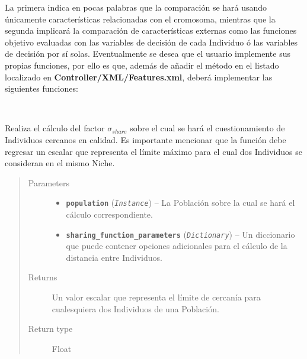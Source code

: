 \documentclass[class=report, crop=false]{standalone}
\begin{document}
La primera indica en pocas palabras que la comparación se 
hará usando únicamente características relacionadas con el 
cromosoma, mientras que la segunda implicará la comparación 
de características externas como las funciones objetivo evaluadas 
con las variables de decisión de cada Individuo ó las variables de 
decisión por sí solas.\medskip\break
Eventualmente se desea que el usuario implemente sus propias funciones, 
por ello es que, además de añadir el método en el listado localizado 
en \textbf{Controller/XML/Features.xml}, deberá implementar las siguientes 
funciones:

\begin{fulllineitems}

~
\vspace{-0.1cm}

Realiza el cálculo del factor \(\sigma_{share}\) sobre el cual se 
hará el cuestionamiento de Individuos cercanos en calidad.\break
Es importante mencionar que la función debe regresar un escalar 
que representa el límite máximo para el cual dos Individuos se 
consideran en el mismo Niche.

\begin{quote}\begin{description}
\item[{Parameters}] \leavevmode\begin{itemize}
\item \textbf{\texttt{population}} (\emph{\texttt{Instance}}) -- La Población sobre la cual se hará el cálculo correspondiente.
\item \textbf{\texttt{sharing\_function\_parameters}} (\emph{\texttt{Dictionary}}) -- Un diccionario que puede contener opciones adicionales para
el cálculo de la distancia entre Individuos.
\end{itemize}
\item[{Returns}] \leavevmode
Un valor escalar que representa el límite de cercanía para cualesquiera dos Individuos
de una Población.
\item[{Return type}] \leavevmode
Float
\end{description}\end{quote}

\end{fulllineitems}
\end{document}
